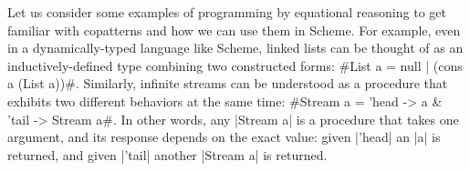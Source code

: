 Let us consider some examples of programming by equational reasoning to get familiar with copatterns and how we can use them in Scheme.
For example, even in a dynamically-typed language like Scheme, linked lists can be thought of as an inductively-defined type combining two constructed forms: \scm#List a = null | (cons a (List a))#.
Similarly, infinite streams can be understood as a procedure that exhibits two different behaviors at the same time: \scm#Stream a = 'head -> a & 'tail -> Stream a#.
In other words, any \scm|Stream a| is a procedure that takes one argument, and its response depends on the exact value: given \scm|'head| an \scm|a| is returned, and given \scm|'tail| another \scm|Stream a| is returned.

